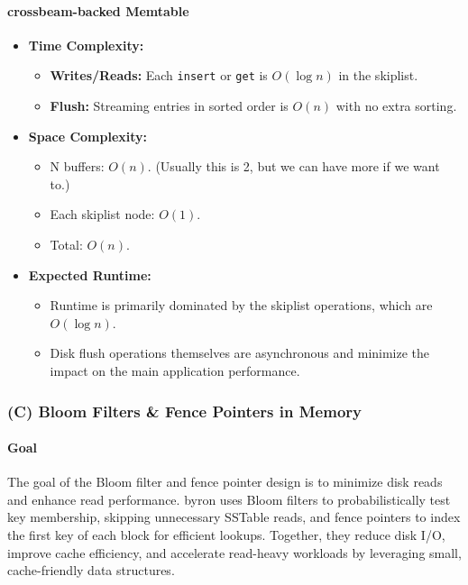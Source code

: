 \documentclass[10pt]{article}
\begin{document}
\paragraph{crossbeam-backed Memtable}
\begin{itemize}[leftmargin=1em,itemsep=0.25ex,parsep=0ex]
  \item \textbf{Time Complexity:}
  \begin{itemize}[leftmargin=1em,itemsep=0.25ex,parsep=0ex]
    \item \textbf{Writes/Reads:} Each \texttt{insert} or \texttt{get} is $O(\log n)$ in the skiplist.
    \item \textbf{Flush:} Streaming entries in sorted order is $O(n)$ with no extra sorting.
  \end{itemize}
  \item \textbf{Space Complexity:}
  \begin{itemize}
    \item N buffers: $O(n)$. (Usually this is 2, but we can have more if we want to.)
    \item Each skiplist node: $O(1)$.
    \item Total: $O(n)$.
  \end{itemize}
  \item \textbf{Expected Runtime:}
  \begin{itemize}[leftmargin=1em,itemsep=0.25ex,parsep=0ex]
    \item Runtime is primarily dominated by the skiplist operations, which are $O(\log n)$.
    \item Disk flush operations themselves are asynchronous and minimize the impact on the main application performance.
  \end{itemize}
\end{itemize}

\subsubsection*{(C) Bloom Filters \& Fence Pointers in Memory}

\paragraph{Goal}
The goal of the Bloom filter and fence pointer design is to minimize disk reads and enhance read performance. byron uses Bloom filters to probabilistically test key membership, skipping unnecessary SSTable reads, and fence pointers to index the first key of each block for efficient lookups. Together, they reduce disk I/O, improve cache efficiency, and accelerate read-heavy workloads by leveraging small, cache-friendly data structures.
\end{document}
